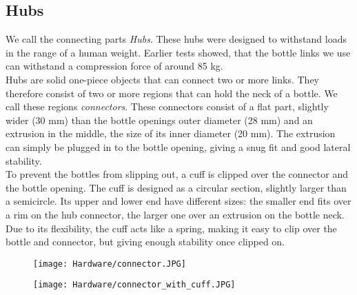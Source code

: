\subsection{Hubs}
We call the connecting parts \textit{Hubs}. These hubs were designed to withstand loads in the range of a human weight. Earlier tests showed, that the bottle links we use can withstand a compression force of around 85 kg.\\
Hubs are solid one-piece objects that can connect two or more links. They therefore consist of two or more regions that can hold the neck of a bottle. We call these regions \textit{connectors}. These connectors consist of a flat part, slightly wider (30 mm) than the bottle openings outer diameter (28 mm) and an extrusion in the middle, the size of its inner diameter (20 mm). The extrusion can simply be plugged in to the bottle opening, giving a snug fit and good lateral stability.\\
To prevent the bottles from slipping out, a cuff is clipped over the connector and the bottle opening. The cuff is designed as a circular section, slightly larger than a semicircle. Its upper and lower end have different sizes: the smaller end fits over a rim on the hub connector, the larger one over an extrusion on the bottle neck. Due to its flexibility, the cuff acts like a spring, making it easy to clip over the bottle and connector, but giving enough stability once clipped on.
\begin{figure}
  \centering
  \begin{minipage}{.5\textwidth}
    \centering
    \texttt{[image: Hardware/connector.JPG]}
    \label{fig:connector}
  \end{minipage}%
  \begin{minipage}{.5\textwidth}
    \centering
    \texttt{[image: Hardware/connector\_with\_cuff.JPG]}
    \label{fig:connector_with_cuff}
  \end{minipage}
\end{figure}

